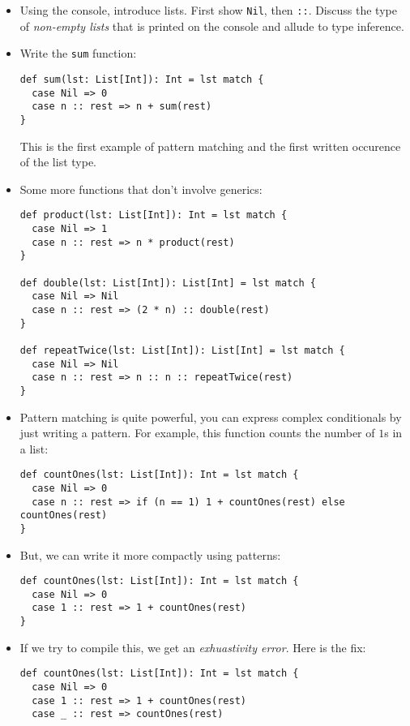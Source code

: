 \documentclass{book}
\begin{document}
\begin{itemize}

\item Using the console, introduce lists.
First show \verb|Nil|, then \verb|::|. Discuss the type of \emph{non-empty lists}
that is printed on the console and allude to type inference.

\item Write the \verb|sum| function:

\begin{verbatim}
def sum(lst: List[Int]): Int = lst match {
  case Nil => 0
  case n :: rest => n + sum(rest)
}
\end{verbatim}

This is the first example of pattern matching and the first written occurence of
the list type.

\item Some more functions that don't involve generics:
%
\begin{verbatim}
def product(lst: List[Int]): Int = lst match {
  case Nil => 1
  case n :: rest => n * product(rest)
}

def double(lst: List[Int]): List[Int] = lst match {
  case Nil => Nil
  case n :: rest => (2 * n) :: double(rest)
}

def repeatTwice(lst: List[Int]): List[Int] = lst match {
  case Nil => Nil
  case n :: rest => n :: n :: repeatTwice(rest)
}
\end{verbatim}

\item Pattern matching is quite powerful, you can express complex conditionals
by just writing a pattern. For example, this function counts the number of
$1$s in a list:
%
\begin{verbatim}
def countOnes(lst: List[Int]): Int = lst match {
  case Nil => 0
  case n :: rest => if (n == 1) 1 + countOnes(rest) else countOnes(rest)
}
\end{verbatim}

\item But, we can write it more compactly using patterns:
%
\begin{verbatim}
def countOnes(lst: List[Int]): Int = lst match {
  case Nil => 0
  case 1 :: rest => 1 + countOnes(rest)
}
\end{verbatim}

\item If we try to compile this, we get an \emph{exhuastivity error}. Here
is the fix:
%
\begin{verbatim}
def countOnes(lst: List[Int]): Int = lst match {
  case Nil => 0
  case 1 :: rest => 1 + countOnes(rest)
  case _ :: rest => countOnes(rest)


\end{verbatim}
\end{itemize}
\end{document}
